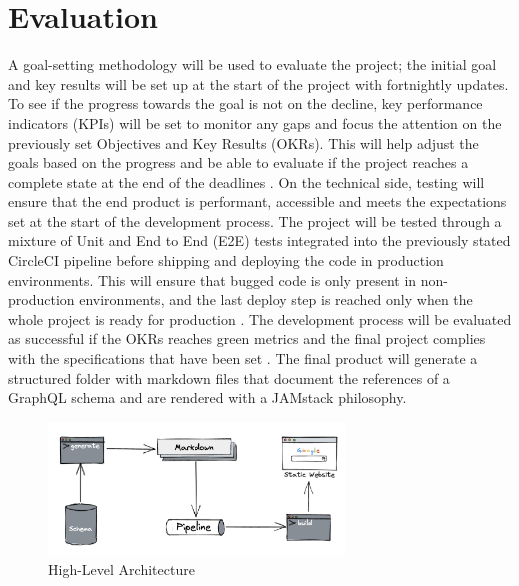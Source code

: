 \section*{Evaluation}
\label{s:Evaluation}
A goal-setting methodology will be used to evaluate the project; the initial
goal and key results will be set up at the start of the project with fortnightly
updates. To see if the progress towards the goal is not on the decline, key
performance indicators (KPIs) will be set to monitor any gaps and focus the
attention on the previously set Objectives and Key Results (OKRs). This will
help adjust the goals based on the progress and be able to evaluate if the
project reaches a complete state at the end of the deadlines
\citep{helmoldLeanManagementKPI2020}. On the technical side, testing will ensure
that the end product is performant, accessible and meets the expectations set at
the start of the development process. The project will be tested through a
mixture of Unit and End to End (E2E) tests integrated into the previously stated
CircleCI pipeline before shipping and deploying the code in production
environments. This will ensure that bugged code is only present in
non-production environments, and the last deploy step is reached only when the
whole project is ready for production \citep{yuUtilisingCIEnvironment2020}. The
development process will be evaluated as successful if the OKRs reaches green
metrics and the final project complies with the specifications that have been
set \citep{helmoldLeanManagementKPI2020}. The final product will generate a
structured folder with markdown files that document the references of a GraphQL
schema and are rendered with a JAMstack philosophy.
\begin{figure}[H]
  \centering
  \includegraphics[width=0.7\textwidth]{figures/architecture}
  \caption{High-Level Architecture}
  \label{f:architecture}
\end{figure}
